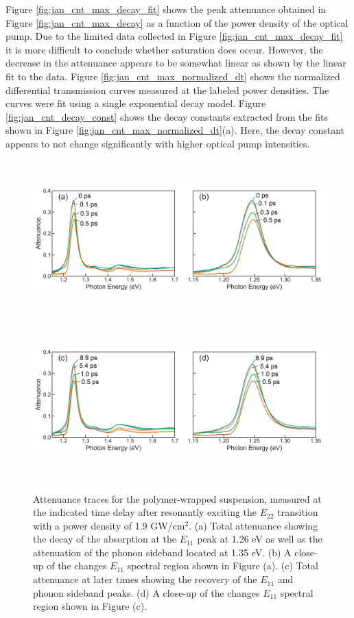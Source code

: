 Figure \ref{fig:jan_cnt_max_decay_fit} shows the peak attenuance obtained in Figure \ref{fig:jan_cnt_max_decay} as a function of the power density of the optical pump. Due to the limited data collected in Figure \ref{fig:jan_cnt_max_decay_fit} it is more difficult to conclude whether saturation does occur. However, the decrease in the attenuance appears to be somewhat linear as shown by the linear fit to the data. Figure \ref{fig:jan_cnt_max_normalized_dt} shows the normalized differential transmission curves measured at the labeled power densities. The curves were fit using a single exponential decay model. Figure \ref{fig:jan_cnt_decay_const} shows the decay constants extracted from the fits shown in Figure \ref{fig:jan_cnt_max_normalized_dt}(a). Here, the decay constant appears to not change significantly with higher optical pump intensities.



\begin{figure}[H]%
	\centering
	{\includegraphics[height=2.4in]{images/chapter_my_data/Jan_CNT_ABS_1mW_decay_relabeled} }
	{\includegraphics[height=2.4in]{images/chapter_my_data/Jan_CNT_ABS_1mW_recovery_relabeled} }
	\caption{Attenuance traces for the polymer-wrapped suspension, measured at the indicated time delay after resonantly exciting the $E_{22}$ transition with a power density of 1.9 GW/cm$^2$. (a) Total attenuance showing the decay of the absorption at the $E_{11}$ peak at 1.26 eV as well as the attenuation of the phonon sideband located at 1.35 eV. (b) A close-up of the changes $E_{11}$ spectral region shown in Figure (a). (c) Total attenuance at later times showing the recovery of the $E_{11}$ and phonon sideband peaks. (d) A close-up of the changes $E_{11}$ spectral region shown in Figure (c).}
	\label{fig:jan_cnt_time_traces}
\end{figure}

